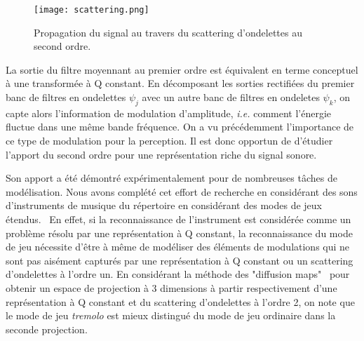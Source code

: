 \begin{figure}
  \texttt{[image: scattering.png]}
  \caption{Propagation du signal au travers du scattering d'ondelettes au second ordre.}
  \label{fig:scat}
\end{figure}


La sortie du filtre moyennant au premier ordre est équivalent en terme conceptuel à une transformée à Q constant. En décomposant les sorties rectifiées du premier banc de filtres en ondelettes $\psi_j$ avec un autre banc de filtres en ondeletes $\psi_k$, on capte alors l'information de modulation d'amplitude, \textit{i.e.} comment l'énergie fluctue dans une même bande fréquence. On a vu précédemment l'importance de ce type de modulation pour la perception. Il est donc opportun de d'étudier l'apport du second ordre pour une représentation riche du signal sonore.  %




Son apport a été démontré expérimentalement pour de nombreuses tâches de modélisation. Nous avons complété cet effort de recherche en considérant des sons d'instruments de musique du répertoire en considérant des modes de jeux étendus.~\cite{lostanlen2018extended} En effet, si la reconnaissance de l'instrument est considérée comme un problème résolu par une représentation à Q constant, la reconnaissance du mode de jeu nécessite d'être à même de modéliser des éléments de modulations qui ne sont pas aisément capturés par une représentation à Q constant ou un scattering d'ondelettes à l'ordre un. En considérant la méthode des "diffusion maps"~\cite{coifman2005geometric} pour obtenir un espace de projection à 3 dimensions à partir respectivement d'une représentation à Q constant et du scattering d'ondelettes à l'ordre 2, on note que le mode de jeu \textsl{tremolo} est mieux distingué du mode de jeu ordinaire dans la seconde projection.

